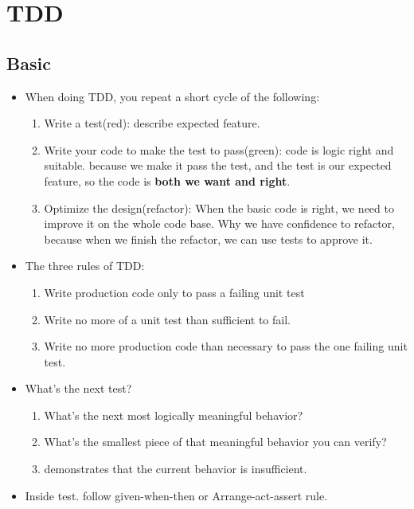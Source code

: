 \documentclass[a4paper,11pt,twoside]{book}
\begin{document}
\section{TDD}
\subsection{Basic}

\begin{itemize}	
	\item When doing TDD, you repeat a short cycle of the following:
	\begin{enumerate}
		\item Write a test(red): describe expected feature. 
		
		\item Write your code to make the test to pass(green): code is logic right and suitable. because we make it pass the test, and the test is our expected feature, so the code is \textbf{both we want and right}.
		
		\item Optimize the design(refactor): When the basic code is right, we need to improve it on the whole code base.  Why we have confidence to refactor, because when we finish the refactor, we can use tests to approve it. 
	\end{enumerate}

	\item The three rules of TDD:
	\begin{enumerate}
		\item Write production code only to pass a failing unit test
		\item Write no more of a unit test than sufficient to fail.
		\item Write no more production code than necessary to pass the one failing unit test. 
	\end{enumerate}

	\item What's the next test? 
	\begin{enumerate}
		\item What's the next most logically meaningful behavior?
		\item What's the smallest piece of that meaningful behavior you can verify?
		\item demonstrates that the current behavior is insufficient.
	\end{enumerate}

	\item Inside test. follow given-when-then or Arrange-act-assert rule. 
		

\end{itemize}
\end{document}
